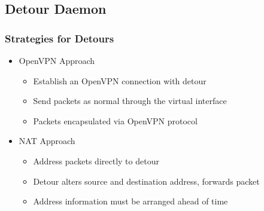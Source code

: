 \documentclass{beamer}
\begin{document}
\subsection{Detour Daemon}

\begin{frame}
  \frametitle{Strategies for Detours}

  \begin{itemize}
  \item OpenVPN Approach
    \begin{itemize}
    \item Establish an OpenVPN connection with detour
    \item Send packets as normal through the virtual interface
    \item Packets encapsulated via OpenVPN protocol
    \end{itemize}
  \item NAT Approach
    \begin{itemize}
    \item Address packets directly to detour
    \item Detour alters source and destination address, forwards packet
    \item Address information must be arranged ahead of time
    \end{itemize}
  \end{itemize}
\end{frame}
\end{document}
